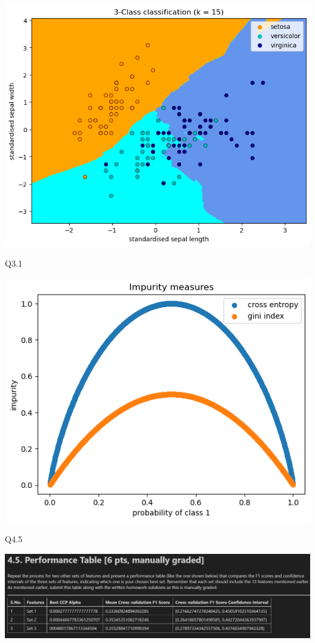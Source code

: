 \documentclass[12pt]{article}
\begin{document}
\includegraphics[scale = 0.5]{2.3.4.png}

Q3.1

\includegraphics{3.1.png}

\vspace{4mm}
\noindent
Q4.5

\includegraphics[scale = 0.5]{4.5.jpg}
\end{document}
